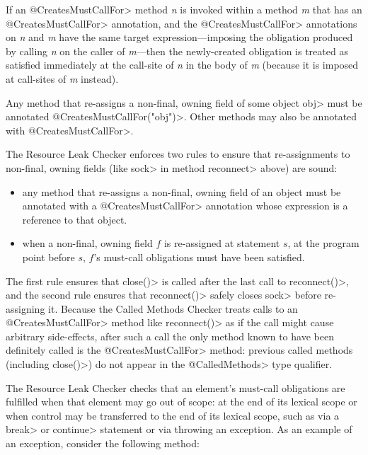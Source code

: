If an \<@CreatesMustCallFor>
method \emph{n} is invoked within a method \emph{m} that has an \<@CreatesMustCallFor> annotation,
and the \<@CreatesMustCallFor> annotations on \emph{n} and \emph{m} have
the same target expression---imposing the obligation produced by calling \emph{n} on the caller of \emph{m}---then
the newly-created obligation is treated as satisfied immediately
at the call-site of \emph{n} in the body of \emph{m} (because it is imposed at call-sites of \emph{m}
instead).



Any method that re-assigns a non-final, owning field of some object \<obj>
must be annotated \<@CreatesMustCallFor("obj")>.
Other methods may also be annotated with \<@CreatesMustCallFor>.

The Resource Leak Checker enforces two rules to ensure that re-assignments
to non-final, owning fields (like \<sock> in method \<reconnect> above) are
sound:
\begin{itemize}
\item any method that re-assigns a non-final, owning field of an object
  must be annotated with a \<@CreatesMustCallFor> annotation
  whose expression is a reference to that object.
\item when a non-final, owning field $f$ is re-assigned at statement $s$,
  at the program point before $s$, $f$'s must-call obligations must have been satisfied.
\end{itemize}
\noindent
The first rule ensures that \<close()> is called after the last call
to \<reconnect()>, and the second rule ensures that \<reconnect()>
safely closes \<sock> before re-assigning it. Because the Called Methods Checker
treats calls to an \<@CreatesMustCallFor> method like \<reconnect()> as if the call might
cause arbitrary side-effects, after such a call the only method known to have been
definitely called is the \<@CreatesMustCallFor> method: previous called
methods (including \<close()>) do not appear in the \<@CalledMethods> type qualifier.




The Resource Leak Checker checks that an element's must-call obligations
are fulfilled when that element may go out of scope: at the end of its
lexical scope or when control may be transferred to the end of its lexical
scope, such as via a \<break> or \<continue> statement or via throwing an
exception.  As an example of an exception, consider the following method:

